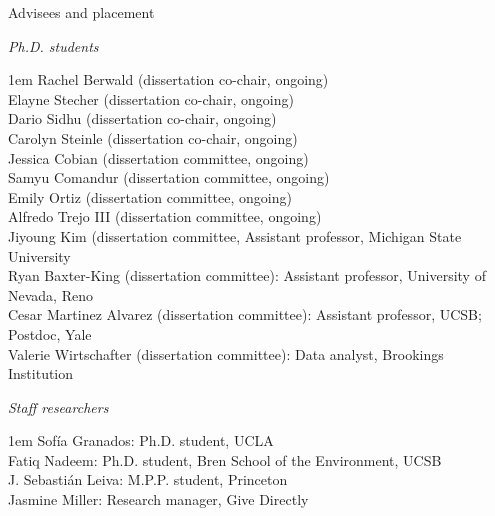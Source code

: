 \documentclass[10.9pt]{article}
\makeatletter
\newcommand\donotbreakhere{\par\nobreak\@afterheading\vspace{1em}}
\newenvironment{indnt}{\begin{adjustwidth}{1em}{}}{\end{adjustwidth}}
\makeatother
\begin{document}
{\large Advisees and placement} \donotbreakhere
 {\large\it \hspace{.15em} Ph.D. students}\donotbreakhere
\begin{indnt}\vspace{-.35em}
Rachel Berwald (dissertation co-chair, ongoing) \\[.5em]
Elayne Stecher (dissertation co-chair, ongoing) \\[.5em]
Dario Sidhu (dissertation co-chair, ongoing) \\[.5em]
Carolyn Steinle (dissertation co-chair, ongoing)\\[.9em]
Jessica Cobian (dissertation committee, ongoing)\\[.5em]
Samyu Comandur (dissertation committee, ongoing)\\[.5em]
Emily Ortiz (dissertation committee, ongoing)\\[.5em]
Alfredo Trejo III (dissertation committee, ongoing)\\[.9em]
Jiyoung Kim (dissertation committee, Assistant professor, Michigan State University\\[.5em]
Ryan Baxter-King (dissertation committee): Assistant professor, University of Nevada, Reno\\[.5em]
Cesar Martinez Alvarez (dissertation committee): Assistant professor, UCSB; Postdoc, Yale\\[.5em]
Valerie Wirtschafter (dissertation committee): Data analyst, Brookings Institution
\end{indnt}\vspace{1em}

 {\large\it \hspace{.15em} Staff researchers}\donotbreakhere
\begin{indnt}\vspace{-.35em}
Sof{\'i}a Granados: Ph.D. student, UCLA\\[0.5em]
Fatiq Nadeem: Ph.D. student, Bren School of the Environment, UCSB\\[.5em]
J. Sebasti{\'a}n Leiva: M.P.P. student, Princeton \\[.5em]
Jasmine Miller: Research manager, Give Directly
\end{indnt}\vspace{1em}
\end{document}
